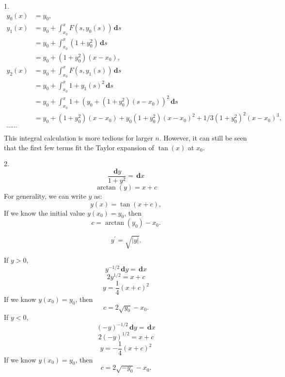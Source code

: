\documentclass[en, normal, 11pt, black]{elegantnote}
\newenvironment{exercise}[1]{\begin{tcolorbox}[colback=black!15, colframe=black!80, breakable, title=#1]}{\end{tcolorbox}}
\newenvironment{solution}{\begin{tcolorbox}[colback=white, colframe=black!50, breakable, title=Solution. ]\setlength{\parskip}{0.8em}}{\end{tcolorbox}}
\newcommand{\der}{\,\mathbf{d}}
\begin{document}
    \begin{solution}
        1. 
        \begin{align*}
            y_0(x)&=y_0, \\
            y_1(x)&=y_0+\int_{x_0}^x F(s, y_0(s))\der s\\
            &=y_0+\int_{x_0}^x(1+y_0^2)\der s\\
            &=y_0+(1+y_0^2)(x-x_0), \\
            y_2(x)&=y_0+\int_{x_0}^x F(s, y_1(s))\der s\\
            &=y_0+\int_{x_0}^x1+y_1(s)^2\der s\\
            &=y_0+\int_{x_0}^x1+(y_0+(1+y_0^2)(s-x_0))^2\der s\\
            &=y_0+(1+y_0^2)(x-x_0)+y_0(1+y_0^2)(x-x_0)^2+1/3(1+y_0^2)^2(x-x_0)^3, \\
            \cdots\cdots&\\
        \end{align*}
        This integral calculation is more tedious for larger $n$. However, it can still be seen that the first few terms fit the Taylor expansion of $\tan(x)$ at $x_0$. 
        
        2. 
        \[\frac{\der y}{1+y^2}=\der x\]
        \[\arctan(y)=x+c\]
        For generality, we can write $y$ as: 
        \[y(x)=\tan(x+c), \]
        If we know the initial value $y(x_0)=y_0$, then
        \[c=\arctan(y_0)-x_0. \]
    \end{solution}
    \begin{exercise}{\textsc{Exercise. }2}
        \[y^\prime=\sqrt{|y|}. \]
    \end{exercise}
    \begin{solution}
        If $y>0$, 
        \[y^{-1/2}\der y=\der x\]
        \[2y^{1/2}=x+c\]
        \[y=\frac{1}{4}(x+c)^2\]
        If we know $y(x_0)=y_0$, then
        \[c=2\sqrt{y_0}-x_0. \]
        If $y<0$, 
        \[(-y)^{-1/2}\der y=\der x\]
        \[2(-y)^{1/2}=x+c\]
        \[y=-\frac{1}{4}(x+c)^2\]
        If we know $y(x_0)=y_0$, then
        \[c=2\sqrt{-y_0}-x_0. \]
    \end{solution}
\end{document}
